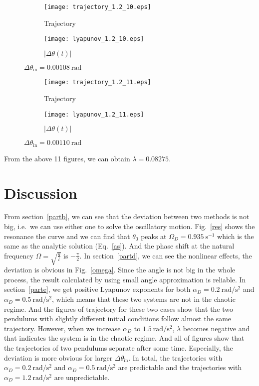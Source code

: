 \documentclass[a4paper]{article}
\begin{document}
	\newpage
	\begin{figure}[H]
		\centering
		\begin{subfigure}{0.85\textwidth}
		\texttt{[image: trajectory\_1.2\_10.eps]}
		\caption{Trajectory}	
		\end{subfigure}
		\begin{subfigure}{0.85\textwidth}
		\texttt{[image: lyapunov\_1.2\_10.eps]}
		\caption{$|\Delta\theta(t)|$}	
		\end{subfigure}
		\caption{$\Delta\theta_{\mathrm{in}} = 0.00108\mathrm{~rad}$}
	\end{figure}
	\newpage
	\begin{figure}[H]
		\centering
		\begin{subfigure}{0.85\textwidth}
		\texttt{[image: trajectory\_1.2\_11.eps]}
		\caption{Trajectory}	
		\end{subfigure}
		\begin{subfigure}{0.85\textwidth}
		\texttt{[image: lyapunov\_1.2\_11.eps]}
		\caption{$|\Delta\theta(t)|$}	
		\end{subfigure}
		\caption{$\Delta\theta_{\mathrm{in}} = 0.00110\mathrm{~rad}$}
	\end{figure}
	From the above 11 figures, we can obtain $\lambda = 0.08275$.
	\newpage
	\section{Discussion}
	From section~\ref{partb}, we can see that the deviation between two methods is not big, i.e.\ we can use either one to solve the oscillatory motion. Fig.~\ref{res} shows the resonance the curve and we can find that $\theta _0$ peaks at $\Omega _D = 0.935 \mathrm{~s^{-1}}$ which is the same as the analytic solution (Eq.~\eqref{as}). And the phase shift at the natural frequency $\Omega = \sqrt{\frac{g}{l}}$ is $-\frac{\pi}{2}$. In section~\ref{partd}, we can see the nonlinear effects, the deviation is obvious in Fig.~\ref{omega}. Since the angle is not big in the whole process, the result calculated by using small angle approximation is reliable. In section~\ref{parte}, we get positive Lyapunov exponents for both $\alpha _D = 0.2\mathrm{~rad/s^2}$ and $\alpha _D = 0.5\mathrm{~rad/s^2}$, which means that these two systems are not in the chaotic regime. And the figures of trajectory for these two cases show that the two pendulums with slightly different initial conditions follow almost the same trajectory. However, when we increase $\alpha_D$ to $1.5\mathrm{~rad/s^2}$, $\lambda$ becomes negative and that indicates the system is in the chaotic regime. And all of figures show that the trajectories of two pendulums separate after some time. Especially, the deviation is more obvious for larger $\Delta\theta _{\mathrm{in}}$. In total, the trajectories with $\alpha _D = 0.2\mathrm{~rad/s^2}$ and $\alpha _D = 0.5\mathrm{~rad/s^2}$ are predictable and the trajectories with $\alpha _D = 1.2\mathrm{~rad/s^2}$ are unpredictable.
\end{document}
